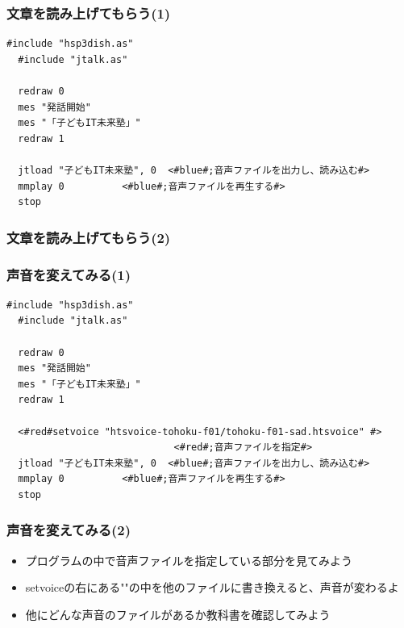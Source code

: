 \documentclass[14pt]{beamer}
\begin{document}
\begin{frame}[fragile]
  \frametitle{文章を読み上げてもらう(1)}
  
  \begin{lstlisting}[title=openjtalk.hsp,label=openjtalk.hsp]
  #include "hsp3dish.as"
  #include "jtalk.as"

  redraw 0
  mes "発話開始"
  mes "「子どもIT未来塾」"
  redraw 1
  
  jtload "子どもIT未来塾", 0	<#blue#;音声ファイルを出力し、読み込む#>
  mmplay 0			<#blue#;音声ファイルを再生する#>
  stop
  \end{lstlisting}
\end{frame}

\begin{frame}
  \frametitle{文章を読み上げてもらう(2)}
\end{frame}

\begin{frame}[fragile]
  \frametitle{声音を変えてみる(1)}
  
  \begin{lstlisting}[title=openjtalk.hsp,label=openjtalk.hsp]
  #include "hsp3dish.as"
  #include "jtalk.as"

  redraw 0
  mes "発話開始"
  mes "「子どもIT未来塾」"
  redraw 1
 
  <#red#setvoice "htsvoice-tohoku-f01/tohoku-f01-sad.htsvoice" #>
                             <#red#;音声ファイルを指定#>
  jtload "子どもIT未来塾", 0	<#blue#;音声ファイルを出力し、読み込む#>
  mmplay 0			<#blue#;音声ファイルを再生する#>
  stop
  \end{lstlisting}
\end{frame}

\begin{frame}
 \frametitle{声音を変えてみる(2)}
  \begin{itemize}
    \item プログラムの中で音声ファイルを指定している部分を見てみよう
    \item setvoiceの右にある""の中を他のファイルに書き換えると、声音が変わるよ
    \item 他にどんな声音のファイルがあるか教科書を確認してみよう
  \end{itemize}
\end{frame}
\end{document}
